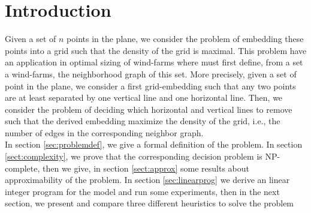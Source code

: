 \section{Introduction}
\label{sect:intro}


Given a set of $n$ points in the plane, we consider the problem of embedding these points into a grid such that the density of the grid is maximal. This problem have an application in optimal sizing of wind-farms \cite{blablabla} where must first define, from a set a wind-farms, the neighborhood graph of this set. More precisely, given a set of point in the plane, we consider a first grid-embedding such that any two points are at least separated by one vertical line and one horizontal line. Then, we consider the problem of deciding which horizontal and vertical lines to remove such that the derived embedding maximize the density of the grid, i.e., the number of edges in the corresponding neighbor graph.\\
In section \ref{sec:problemdef}, we give a formal definition of the problem. In section \ref{sect:complexity}, we prove that the corresponding decision problem is NP-complete, then we give, in section \ref{sect:approx} some results about approximability of the problem. In section \ref{sec:linearprog} we derive an linear integer program for the model and run some experiments, then in the next section, we present and compare three different heuristics to solve the problem

\begin{comment}
\begin{itemize}
\item Définition informelle du problème 
\item Motivations, exemples d'applications
\item Etat de l'art?
\item Plan et contributions
\end{itemize}
\end{comment}
